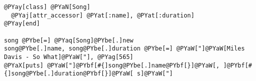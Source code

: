 \begin{Verbatim}[commandchars=@\[\]]
@PYay[class] @PYaN[Song]
  @PYaj[attr_accessor] @PYat[:name], @PYat[:duration]
@PYay[end]

song @PYbe[=] @PYaq[Song]@PYbe[.]new
song@PYbe[.]name, song@PYbe[.]duration @PYbe[=] @PYaW["]@PYaW[Miles Davis - So What]@PYaW["], @PYag[565]
@PYaX[puts] @PYaW["]@PYbf[#{]song@PYbe[.]name@PYbf[}]@PYaW[, ]@PYbf[#{]song@PYbe[.]duration@PYbf[}]@PYaW[ s]@PYaW["]
\end{Verbatim}
